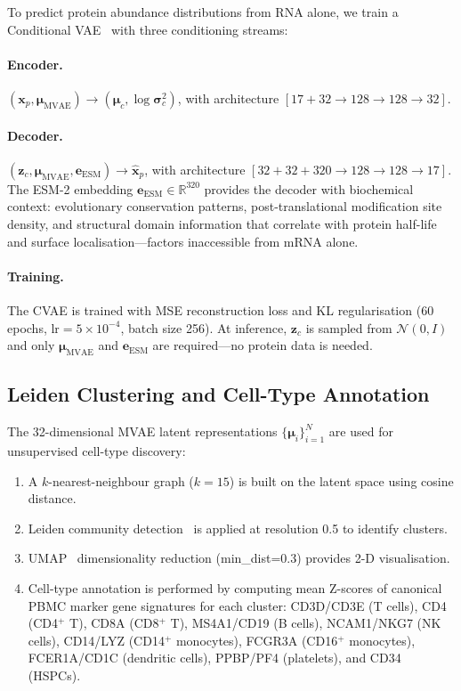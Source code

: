 \documentclass[11pt,a4paper]{article}
\newcommand{\RR}{\mathbb{R}}
\newcommand{\bx}{\mathbf{x}}
\newcommand{\bz}{\mathbf{z}}
\newcommand{\bmu}{\boldsymbol{\mu}}
\newcommand{\bsig}{\boldsymbol{\sigma}}
\begin{document}
To predict protein abundance distributions from RNA alone, we train a Conditional VAE~\citep{sohn2015} with three conditioning streams:

\paragraph{Encoder.}
$(\bx_p, \bmu_\text{MVAE}) \to (\bmu_c, \log\bsig_c^2)$, with architecture $[17+32 \to 128 \to 128 \to 32]$.

\paragraph{Decoder.}
$(\bz_c, \bmu_\text{MVAE}, \mathbf{e}_\text{ESM}) \to \hat{\bx}_p$, with architecture $[32+32+320 \to 128 \to 128 \to 17]$.
The ESM-2 embedding $\mathbf{e}_\text{ESM} \in \RR^{320}$ provides the decoder with biochemical context: evolutionary conservation patterns, post-translational modification site density, and structural domain information that correlate with protein half-life and surface localisation---factors inaccessible from mRNA alone.

\paragraph{Training.}
The CVAE is trained with MSE reconstruction loss and KL regularisation (60 epochs, $\text{lr}=5\times10^{-4}$, batch size 256).
At inference, $\bz_c$ is sampled from $\mathcal{N}(0,I)$ and only $\bmu_\text{MVAE}$ and $\mathbf{e}_\text{ESM}$ are required—no protein data is needed.

\subsection{Leiden Clustering and Cell-Type Annotation}\label{ssec:clustering}

The 32-dimensional MVAE latent representations $\{\bmu_i\}_{i=1}^{N}$ are used for unsupervised cell-type discovery:

\begin{enumerate}[leftmargin=*]
  \item A $k$-nearest-neighbour graph ($k=15$) is built on the latent space using cosine distance.
  \item Leiden community detection~\citep{traag2019} is applied at resolution 0.5 to identify clusters.
  \item UMAP~\citep{mcinnes2018} dimensionality reduction (min\_dist=0.3) provides 2-D visualisation.
  \item Cell-type annotation is performed by computing mean Z-scores of canonical PBMC marker gene signatures for each cluster: CD3D/CD3E (T cells), CD4 (CD4$^+$ T), CD8A (CD8$^+$ T), MS4A1/CD19 (B cells), NCAM1/NKG7 (NK cells), CD14/LYZ (CD14$^+$ monocytes), FCGR3A (CD16$^+$ monocytes), FCER1A/CD1C (dendritic cells), PPBP/PF4 (platelets), and CD34 (HSPCs).
\end{enumerate}
\end{document}
